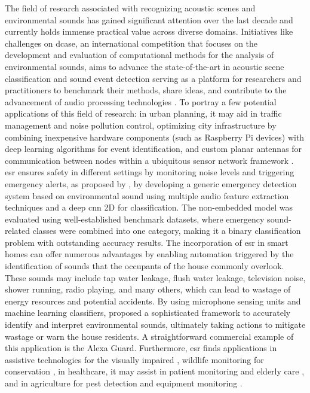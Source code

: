 The field of research associated with recognizing acoustic scenes and environmental sounds has gained significant attention over the last decade and currently holds immense practical value across diverse domains. Initiatives like challenges on \gls{dcase}, an international competition that focuses on the development and evaluation of computational methods for the analysis of environmental sounds, aims to advance the state-of-the-art in acoustic scene classification and sound event detection serving as a platform for researchers and practitioners to benchmark their methods, share ideas, and contribute to the advancement of audio processing technologies \cite{Mesaros2019}. To portray a few potential applications of this field of research: in urban planning, it may aid in traffic management and noise pollution control, optimizing city infrastructure by combining inexpensive hardware components (such as Raspberry Pi devices) with deep learning algorithms for event identification, and custom planar antennas for communication between nodes within a ubiquitous sensor network framework \cite{VidaaVila2020}. \gls{esr} ensures safety in different settings by monitoring noise levels and triggering emergency alerts, as proposed by \textcite{Sharma2021}, by developing a generic emergency detection system based on environmental sound using multiple audio feature extraction techniques and a deep \gls{cnn} 2D for classification. The non-embedded model was evaluated using well-established benchmark datasets, where emergency sound-related classes were combined into one category, making it a binary classification problem with outstanding accuracy results. The incorporation of \gls{esr} in smart homes can offer numerous advantages by enabling automation triggered by the identification of sounds that the occupants of the house commonly overlook. These sounds may include tap water leakage, flush water leakage, television noise, shower running, radio playing, and many others, which can lead to wastage of energy resources and potential accidents. By using microphone sensing units and machine learning classifiers, \textcite{Pandya2021} proposed a sophisticated framework to accurately identify and interpret environmental sounds, ultimately taking actions to mitigate wastage or warn the house residents. A straightforward commercial example of this application is the Alexa Guard. Furthermore, \gls{esr} finds applications in assistive technologies for the visually impaired \cite{Huang2023}, wildlife monitoring for conservation \cite{Jeantet2023}, in healthcare, it may assist in patient monitoring \cite{Fukuyama2022} and elderly care \cite{Saraubon2018}, and in agriculture for pest detection \cite{Branding2023} and equipment monitoring \cite{Jeong2022}.  

